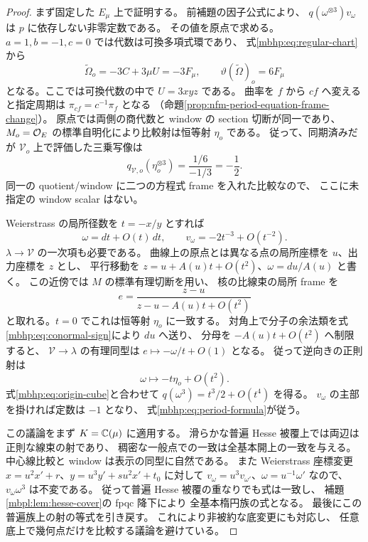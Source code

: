 \begin{proof}
まず固定した $E_\mu$ 上で証明する。
前補題の因子公式により、
$q(\omega^{\otimes3})v_\omega$ は $p$ に依存しない非零定数である。
その値を原点で求める。
$a=1,b=-1,c=0$ では代数は可換多項式環であり、
式\eqref{mbhp:eq:regular-chart}から
\begin{equation}\label{mbhp:eq:origin-curvatures}
 \widetilde\Omega_o=-3C+3\mu U=-3F_\mu,\qquad
 \vartheta(\widetilde\Omega)_o=6F_\mu
\end{equation}
となる。ここでは可換代数の中で $U=3xyz$ である。
曲率を $f$ から $cf$ へ変えると指定周期は
$\pi_{cf}=c^{-1}\pi_f$ となる
（命題\ref{prop:nfm-period-equation-frame-change}）。
原点では両側の商代数と window の section 切断が同一であり、
$M_o=\mathcal O_E$ の標準自明化により比較射は恒等射 $\eta_o$ である。
従って、同期済みだが $\mathcal V_o$ 上で評価した三乗写像は
\begin{equation}\label{mbhp:eq:origin-cube}
 q_{\mathcal V,o}(\eta_o^{\otimes3})
        =\frac{1/6}{-1/3}=-\frac12.
\end{equation}
同一の quotient/window に二つの方程式 frame を入れた比較なので、
ここに未指定の window scalar はない。

Weierstrass の局所径数を $t=-x/y$ とすれば
\[
 \omega=dt+O(t)\,dt,\qquad
 v_\omega=-2t^{-3}+O(t^{-2}).
\]
$\lambda\to\mathcal V$ の一次項も必要である。
曲線上の原点とは異なる点の局所座標を $u$、出力座標を $z$ とし、
平行移動を
$z=u+A(u)t+O(t^2)$、$\omega=du/A(u)$ と書く。
この近傍では $M$ の標準有理切断を用い、
核の比線束の局所 frame を
\[
 e=\frac{z-u}{z-u-A(u)t+O(t^2)}
\]
と取れる。$t=0$ でこれは恒等射 $\eta_o$ に一致する。
対角上で分子の余法類を式\eqref{mbhp:eq:conormal-sign}により $du$ へ送り、
分母を $-A(u)t+O(t^2)$ へ制限すると、
$\mathcal V\to\lambda$ の有理同型は
$e\mapsto-\omega/t+O(1)$ となる。
従って逆向きの正則射は
\[
 \omega\longmapsto-t\eta_o+O(t^2).
\]
式\eqref{mbhp:eq:origin-cube}と合わせて
$q(\omega^3)=t^3/2+O(t^4)$ を得る。
$v_\omega$ の主部を掛ければ定数は $-1$ となり、
式\eqref{mbhp:eq:period-formula}が従う。

この議論をまず $K=\mathbb C(\mu)$ に適用する。
滑らかな普遍 Hesse 被覆上では両辺は正則な線束の射であり、
稠密な一般点での一致は全基本開上の一致を与える。
中心線比較と window は表示の同型に自然である。
また Weierstrass 座標変更
$x=u^2x'+r$、$y=u^3y'+su^2x'+t_0$ に対して
$v_\omega=u^3v_{\omega'}$、$\omega=u^{-1}\omega'$ なので、
$v_\omega\omega^3$ は不変である。
従って普遍 Hesse 被覆の重なりでも式は一致し、
補題\ref{mbpl:lem:hesse-cover}の fpqc 降下により
全基本楕円族の式となる。
最後にこの普遍族上の射の等式を引き戻す。
これにより非被約な底変更にも対応し、
任意底上で幾何点だけを比較する議論を避けている。
\end{proof}

